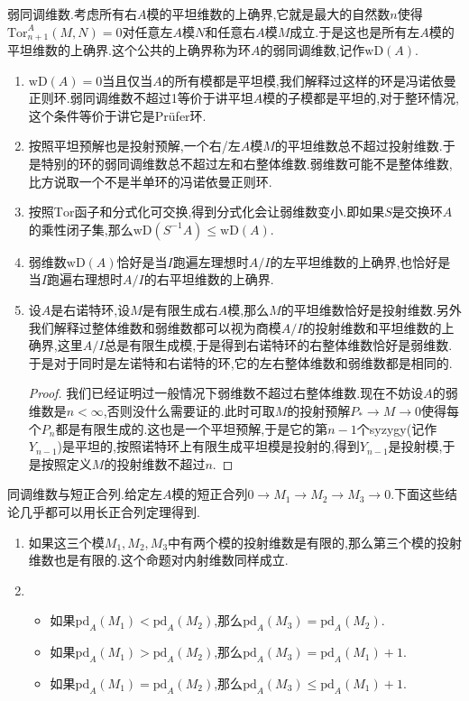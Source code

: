 弱同调维数.考虑所有右$A$模的平坦维数的上确界,它就是最大的自然数$n$使得$\mathrm{Tor}_{n+1}^A(M,N)=0$对任意左$A$模$N$和任意右$A$模$M$成立.于是这也是所有左$A$模的平坦维数的上确界.这个公共的上确界称为环$A$的弱同调维数,记作$\mathrm{wD}(A)$.
\begin{enumerate}
	\item $\mathrm{wD}(A)=0$当且仅当$A$的所有模都是平坦模,我们解释过这样的环是冯诺依曼正则环.弱同调维数不超过1等价于讲平坦$A$模的子模都是平坦的,对于整环情况,这个条件等价于讲它是Pr\"ufer环.
	\item 按照平坦预解也是投射预解,一个右/左$A$模$M$的平坦维数总不超过投射维数.于是特别的环的弱同调维数总不超过左和右整体维数.弱维数可能不是整体维数,比方说取一个不是半单环的冯诺依曼正则环.
	\item 按照$\mathrm{Tor}$函子和分式化可交换,得到分式化会让弱维数变小.即如果$S$是交换环$A$的乘性闭子集,那么$\mathrm{wD}(S^{-1}A)\le\mathrm{wD}(A)$.
	\item 弱维数$\mathrm{wD}(A)$恰好是当$I$跑遍左理想时$A/I$的左平坦维数的上确界,也恰好是当$I$跑遍右理想时$A/I$的右平坦维数的上确界.
	\item 设$A$是右诺特环,设$M$是有限生成右$A$模,那么$M$的平坦维数恰好是投射维数.另外我们解释过整体维数和弱维数都可以视为商模$A/I$的投射维数和平坦维数的上确界,这里$A/I$总是有限生成模,于是得到右诺特环的右整体维数恰好是弱维数.于是对于同时是左诺特和右诺特的环,它的左右整体维数和弱维数都是相同的.
	\begin{proof}
		
		我们已经证明过一般情况下弱维数不超过右整体维数.现在不妨设$A$的弱维数是$n<\infty$,否则没什么需要证的.此时可取$M$的投射预解$P_*\to M\to0$使得每个$P_n$都是有限生成的.这也是一个平坦预解,于是它的第$n-1$个syzygy(记作$Y_{n-1}$)是平坦的,按照诺特环上有限生成平坦模是投射的,得到$Y_{n-1}$是投射模,于是按照定义$M$的投射维数不超过$n$.
	\end{proof}
\end{enumerate}

同调维数与短正合列.给定左$A$模的短正合列$0\to M_1\to M_2\to M_3\to0$.下面这些结论几乎都可以用长正合列定理得到.
\begin{enumerate}
	\item 如果这三个模$M_1,M_2,M_3$中有两个模的投射维数是有限的,那么第三个模的投射维数也是有限的.这个命题对内射维数同样成立.
	\item 
	\begin{itemize}
		\item 如果$\mathrm{pd}_A(M_1)<\mathrm{pd}_A(M_2)$,那么$\mathrm{pd}_A(M_3)=\mathrm{pd}_A(M_2)$.
		\item 如果$\mathrm{pd}_A(M_1)>\mathrm{pd}_A(M_2)$,那么$\mathrm{pd}_A(M_3)=\mathrm{pd}_A(M_1)+1$.
		\item 如果$\mathrm{pd}_A(M_1)=\mathrm{pd}_A(M_2)$,那么$\mathrm{pd}_A(M_3)\le\mathrm{pd}_A(M_1)+1$.
	\end{itemize}
\end{enumerate}

